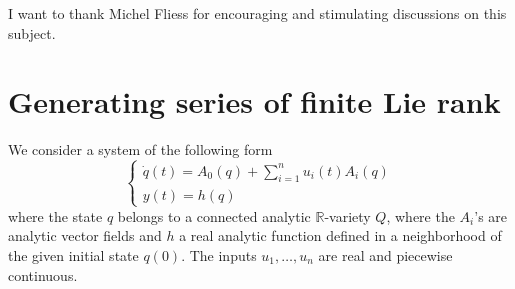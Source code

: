 \documentclass[a4paper,12pt]{article}
\newcommand{\R}{\mathbb{R}}
\begin{document}
I want to thank Michel Fliess for encouraging and stimulating discussions on this subject.

\section{Generating series of finite Lie rank}

We consider a system of the following form
\begin{equation} \label{eq:1}
	\begin{cases}
		\dot{q}(t)=A_0(q)+\sum_{i=1}^n u_i(t) A_i(q) \\
		y(t)=h(q)
	\end{cases}
\end{equation}
where the state $q$ belongs to a connected analytic $\R$-variety $Q$, where the $A_i$'s are analytic vector fields and $h$ a real analytic function defined in a neighborhood of the given initial state $q(0)$. The inputs $u_1, \ldots, u_n$ are real and piecewise continuous.
\end{document}
